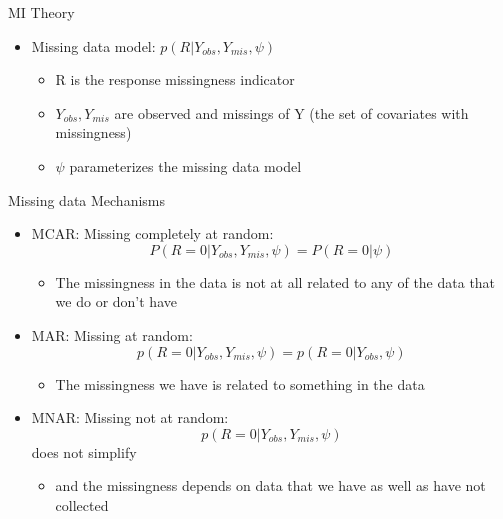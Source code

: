 \begin{frame}{MI Theory}
 \begin{itemize}
  \item Missing data model: $p(R|Y_{obs},Y_{mis},\psi)$
  \begin{itemize}
     \item R is the response missingness indicator
   \item $Y_{obs},Y_{mis}$ are observed and missings of Y (the set of covariates with missingness)
   \item $\psi$ parameterizes the missing data model
  \end{itemize}

 \end{itemize}

\end{frame}


\begin{frame}{Missing data Mechanisms}
\begin{itemize}

\item MCAR: Missing completely at random:  $$P(R=0|Y_{obs},Y_{mis},\psi)=P(R=0|\psi)$$
\begin{itemize}
\item The missingness in the data is not at all related to any of the data that we do or don't have
\end{itemize}
\item MAR: Missing at random: $$p(R=0|Y_{obs},Y_{mis},\psi)= p(R=0|Y_{obs},\psi)$$
\begin{itemize}
 \item The missingness we have is related to something in the data 
\end{itemize}
\item MNAR: Missing not at random: $$p(R=0|Y_{obs},Y_{mis},\psi)$$ does not simplify
\begin{itemize}
 \item  and the missingness depends on data that we have as well as have not collected
\end{itemize}
\end{itemize}
\end{frame}

